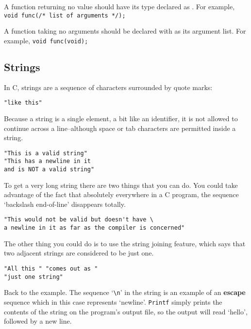     A function returning no value should have its type declared as
     \void. For example,
     \texttt{void func(/* list of arguments */);}
    

    A function taking no arguments should be declared with \void{}
     as its argument list. For example, \texttt{void func(void);}

   

  

  \subsection{Strings}
   

   In C, strings are a sequence of characters surrounded by quote marks:


   \begin{Verbatim}
"like this"
\end{Verbatim}

   Because a string is a single element, a bit like an identifier, it is not
    allowed to continue across a line--although space or tab characters
    are permitted inside a string.


   \begin{Verbatim}
"This is a valid string"
"This has a newline in it
and is NOT a valid string"
\end{Verbatim}

   To get a very long string there are two things that you can do. You could
    take advantage of the fact that absolutely everywhere in a C program, the
    sequence `backslash end-of-line' disappears totally.


   \begin{Verbatim}
"This would not be valid but doesn't have \
a newline in it as far as the compiler is concerned"
\end{Verbatim}

   The other thing you could do is to use the string joining feature,
    which says that two adjacent strings are considered to be just one.


   \begin{Verbatim}
"All this " "comes out as "
"just one string"
\end{Verbatim}

   Back to the example. The sequence `\texttt{\textbackslash n}' in the
    string is an example of an \textbf{escape} sequence which in this case
    represents `newline'. \texttt{Printf} simply prints the
    contents of the string on the program's output file, so the output will
    read `hello', followed by a new line.


